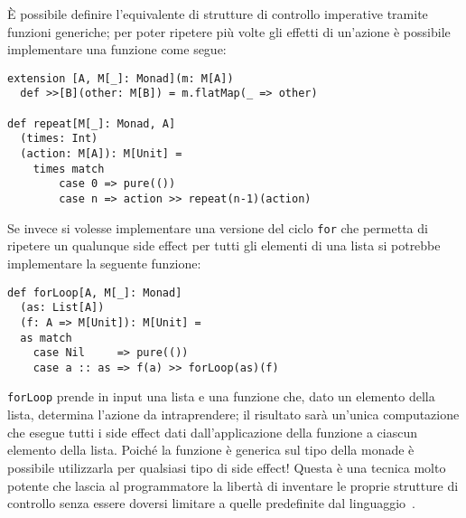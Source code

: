 È possibile definire l'equivalente di strutture di controllo imperative tramite funzioni generiche; per poter ripetere più volte gli effetti di un'azione è possibile implementare una funzione come segue:
\begin{lstlisting}[language=scala3]
extension [A, M[_]: Monad](m: M[A])
  def >>[B](other: M[B]) = m.flatMap(_ => other)

def repeat[M[_]: Monad, A]
  (times: Int)
  (action: M[A]): M[Unit] =
	times match
		case 0 => pure(())
		case n => action >> repeat(n-1)(action)
\end{lstlisting}

Se invece si volesse implementare una versione del ciclo \lstinline{for} che permetta di ripetere un qualunque side effect per tutti gli elementi di una lista si potrebbe implementare la seguente funzione:
\begin{lstlisting}[language=scala3]
def forLoop[A, M[_]: Monad]
  (as: List[A])
  (f: A => M[Unit]): M[Unit] = 
  as match 
    case Nil     => pure(())	
    case a :: as => f(a) >> forLoop(as)(f)
\end{lstlisting}
\lstinline{forLoop} prende in input una lista e una funzione che, dato un elemento della lista, determina l'azione da intraprendere; il risultato sarà un'unica computazione che esegue tutti i side effect dati dall'applicazione della funzione a ciascun elemento della lista. Poiché la funzione è generica sul tipo della monade è possibile utilizzarla per qualsiasi tipo di side effect!
Questa è una tecnica molto potente che lascia al programmatore la libertà di inventare le proprie strutture di controllo senza essere doversi limitare a quelle predefinite dal linguaggio~\cite{cit:tackling-the-awkward-squad}.
